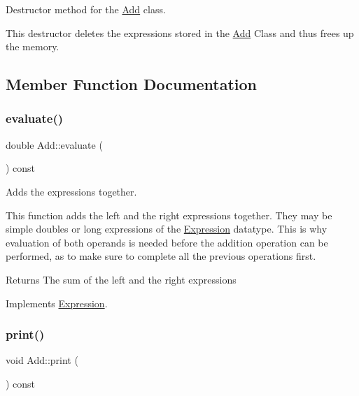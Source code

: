 Destructor method for the \hyperlink{class_add}{Add} class. 

This destructor deletes the expressions stored in the \hyperlink{class_add}{Add} Class and thus frees up the memory. 

\subsection{Member Function Documentation}
\mbox{\label{class_add_ac5b3425e7ac47b9f9a83e2f6da0d81ca}} 
\subsubsection{\texorpdfstring{evaluate()}{evaluate()}}
{\footnotesize\ttfamily double Add\+::evaluate (\begin{DoxyParamCaption}{ }\end{DoxyParamCaption}) const\hspace{0.3cm}{\ttfamily [virtual]}}



Adds the expressions together. 

This function adds the left and the right expressions together. They may be simple doubles or long expressions of the \hyperlink{class_expression}{Expression} datatype. This is why evaluation of both operands is needed before the addition operation can be performed, as to make sure to complete all the previous operations first.

\begin{DoxyReturn}{Returns}
The sum of the left and the right expressions 
\end{DoxyReturn}


Implements \hyperlink{class_expression_a7437adfabeaeb0500d62d10c43a1f853}{Expression}.

\mbox{\label{class_add_ad5af4ca57a44efab928c58ef39b00df1}} 
\subsubsection{\texorpdfstring{print()}{print()}}
{\footnotesize\ttfamily void Add\+::print (\begin{DoxyParamCaption}{ }\end{DoxyParamCaption}) const\hspace{0.3cm}{\ttfamily [virtual]}}



